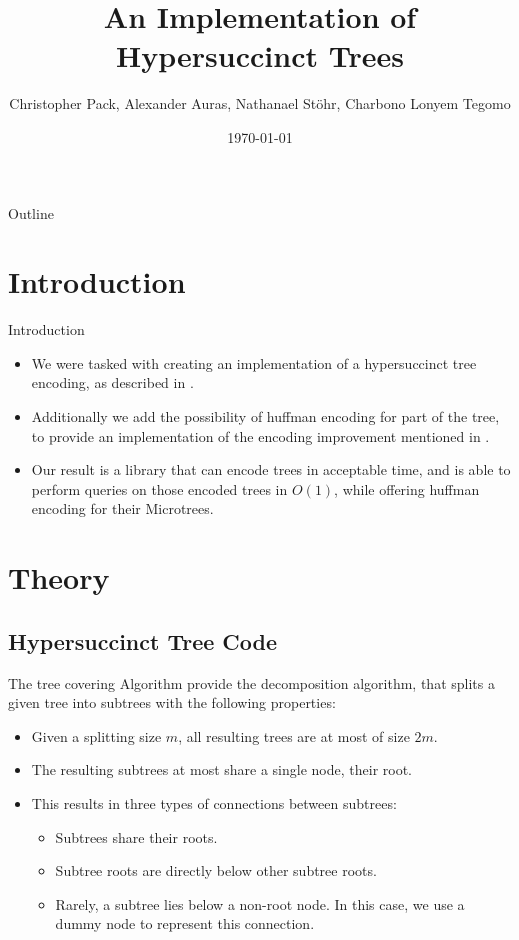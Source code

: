 \documentclass{beamer}
\title[An Implementation of Hypersuccinct Trees]
{An Implementation of Hypersuccinct Trees}
\author{Christopher Pack, Alexander Auras, Nathanael Stöhr, Charbono Lonyem Tegomo}
\institute[Universität Siegen]
{
  Lehrstuhl für theoretische Informatik\\
  Universität Siegen}
\date{\today}
\begin{document}
\begin{frame}
  \titlepage
\end{frame}

\begin{frame}{Outline}
  \tableofcontents
\end{frame}

\section[Introduction]{Introduction}

\begin{frame}{Introduction}
	\begin{itemize}
	\item
	We were tasked with creating an implementation of a hypersuccinct tree encoding, as described in \cite{farzanMunro}.
	\item
	Additionally we add the possibility of huffman encoding for part of the tree, to provide an implementation of the encoding improvement mentioned in \cite{universalSuccinct}.
	\item
	Our result is a library that can encode trees in acceptable time, and is able to perform queries on those encoded trees in $O(1)$, while offering huffman encoding for their Microtrees.
	\end{itemize}
\end{frame}

\section{Theory}

\subsection[Hypersuccinct Tree Code]{Hypersuccinct Tree Code}

\begin{frame}{The tree covering Algorithm} %
	\cite{farzanMunro} provide the decomposition algorithm, that splits a given tree into subtrees with the following properties:
\begin{itemize}
	\item
		Given a splitting size $m$, all resulting trees are at most of size $2m$.
	\item
		The resulting subtrees at most share a single node, their root.
	\item
		This results in three types of connections between subtrees:
		\begin{itemize}
			\item
				Subtrees share their roots.
			\item
				Subtree roots are directly below other subtree roots.
			\item
				Rarely, a subtree lies below a non-root node. In this case, we use a dummy node to represent this connection.
		\end{itemize}
\end{itemize}
\end{frame}
\end{document}
